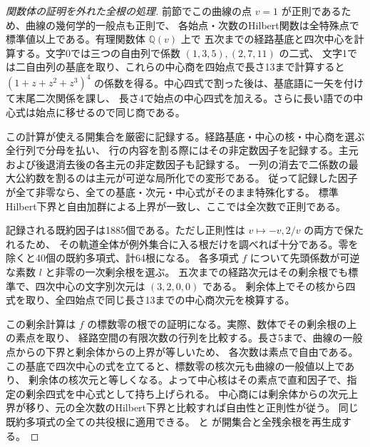 \begin{proof}[関数体の証明を外れた全根の処理]
前節でこの曲線の点 $v=1$ が正則であるため、曲線の幾何学的一般点も正則で、
各始点・次数のHilbert関数は全特殊点で標準値以上である。有理関数体 $\mathbb Q(v)$ 上で
五次までの経路基底と四次中心を計算する。文字0では三つの自由列で係数 $(1,3,5),(2,7,11)$ の二式、
文字1では二自由列の基底を取り、これらの中心商を四始点で長さ13まで計算すると
$(1+z+z^2+z^3)^4$ の係数を得る。中心四式で割った後は、基底語に一矢を付けて末尾二次関係を課し、
長さ4で始点の中心四式を加える。さらに長い語での中心式は始点に移せるので同じ商である。

この計算が使える開集合を厳密に記録する。経路基底・中心の核・中心商を選ぶ全行列で分母を払い、
行の内容を割る際にはその非定数因子を記録する。主元および後退消去後の各主元の非定数因子も記録する。
一列の消去で二係数の最大公約数を割るのは主元が可逆な局所化での変形である。
従って記録した因子が全て非零なら、全ての基底・次元・中心式がそのまま特殊化する。
標準Hilbert下界と自由加群による上界が一致し、ここでは全次数で正則である。

記録される既約因子は1885個である。ただし正則性は $v\mapsto-v,2/v$ の両方で保たれるため、
その軌道全体が例外集合に入る根だけを調べれば十分である。零を除くと40個の既約多項式、計64根になる。
各多項式 $f$ について先頭係数が可逆な素数 $l$ と非零の一次剰余根を選ぶ。
五次までの経路次元はその剰余根でも標準で、四次中心の文字別次元は $(3,2,0,0)$ である。
剰余体上でその核から四式を取り、全四始点で同じ長さ13までの中心商次元を検算する。

この剰余計算は $f$ の標数零の根での証明になる。実際、数体でその剰余根の上の素点を取り、
経路空間の有限次数の行列を比較する。長さ5まで、曲線の一般点からの下界と剰余体からの上界が等しいため、
各次数は素点で自由である。この基底で四次中心の式を立てると、標数零の核次元も曲線の一般値以上であり、
剰余体の核次元と等しくなる。よって中心核はその素点で直和因子で、指定の剰余四式を中心式として持ち上げられる。
中心商には剰余体からの次元上界が移り、元の全次数のHilbert下界と比較すれば自由性と正則性が従う。
同じ既約多項式の全ての共役根に適用できる。
 と
 が開集合と全残余根を再生成する。
\end{proof}
